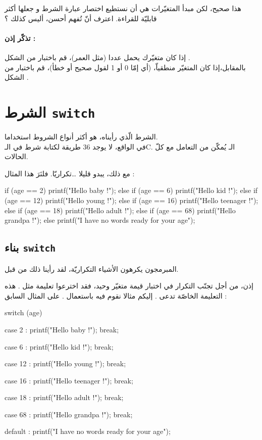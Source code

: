 هذا صحيح، لكن مبدأ المتغيّرات هي أن نستطيع اختصار عبارة الشرط و جعلها أكثر قابليّة للقراءة. اعترف أنّ
تُفهم أحسن، أليس كذلك ؟

\paragraph{تذكّر إذن :}
إذا كان متغيّرك يحمل عددا (مثل العمر)، قم باختبار من الشكل
.\\
بالمقابل،إذا كان المتغيّر منطقياّ، (أي إمّا 0 أو 1 لقول صحيح أو خطأ)، قم باختبار من الشكل
.

\section{الشرط \texttt{switch}}

الشرط
الّذي رأيناه، هو أكثر أنواع الشروط استخداما.\\
في الواقع، لا يوجد 36 طريقة لكتابة شرط في الـ\textenglish{C}.
الـ
يُمكّن من التعامل مع كلّ الحالات.

مع ذلك،
يبدو قليلا \dots تكراريّا. فلنَرَ هذا المثال :

\begin{Csource}
if (age == 2)
{
	printf("Hello baby !");
}
else if (age == 6)
{
	printf("Hello kid !");
}
else if (age == 12)
{
	printf("Hello young !");
}
else if (age == 16)
{
	printf("Hello teenager !");
}
else if (age == 18)
{
	printf("Hello adult !");
}
else if (age == 68)
{
	printf("Hello grandpa !");
}
else
{
	printf("I have no words ready for your age");
}
\end{Csource}

\subsection{بناء \texttt{switch}}

المبرمجون يكرهون الأشياء التكراريّة، لقد رأينا ذلك من قبل.

إذن، من أجل تجنّب التكرار في اختبار قيمة متغيّر وحيد، فقد اخترعوا تعليمة مثل
.
هذه التعليمة الخاصّة تدعى
.
إليكم مثالا نقوم فيه باستعمال
.
على المثال السابق :

\begin{Csource}
switch (age)
{
	case 2 :
	printf("Hello baby !");
	break;
	
	case 6 :
	printf("Hello kid !");
	break;
	
	case 12 :
	printf("Hello young !");
	break;
	
	case 16 :
	printf("Hello teenager !");
	break;
	
	case 18 :
	printf("Hello adult !");
	break;
	
	case 68 :
	printf("Hello grandpa !");
	break;
	
	default :
	printf("I have no words ready for your age");
}
\end{Csource}


